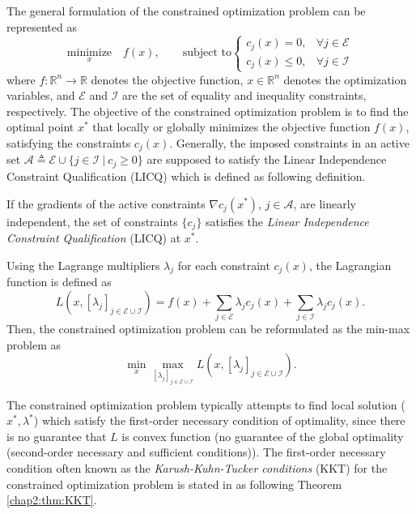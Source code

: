 The general formulation of the constrained optimization problem can be represented as 
\begin{equation}
    \underset{x}{\text{minimize}}\quad f(x),
    \quad\quad
    \text{subject to}
    \begin{cases}
      c_j(x)= 0,    & \forall j\in\mathcal E\\
      c_j(x)\leq 0, & \forall j\in\mathcal I 
    \end{cases}
\end{equation}
where $f:\mathbb R^n\to\mathbb R$ denotes the objective function, $x\in\mathbb R^n$ denotes the optimization variables, and $\mathcal E$ and $\mathcal I$ are the set of equality and inequality constraints, respectively.
The objective of the constrained optimization problem is to find the optimal point $x^*$ that locally or globally minimizes the objective function $f(x)$, satisfying the constraints $c_j(x)$.
Generally, the imposed constraints in an active set $\mathcal A\triangleq\mathcal E \cup \{j\in\mathcal I\ \vert \ c_j\ge0\}$ are supposed to satisfy the Linear Independence Constraint Qualification (LICQ) which is defined as following definition.

\begin{definition}
  If the gradients of the active constraints $\nabla c_j(x^*)$, $j\in\mathcal A$, are linearly independent, the set of constraints $\{c_j\}$ satisfies the \textit{Linear Independence Constraint Qualification} (LICQ) at $x^*$.
  \label{chap2:def:LICQ}  
\end{definition}

Using the Lagrange multipliers $\lambda_j$ for each constraint $c_j(x)$, the Lagrangian function is defined as
\begin{equation}
    L(x,[\lambda_j]_{j\in\mathcal E\cup\mathcal I}) = f(x) + \sum_{j\in\mathcal E}\lambda_jc_j(x) + \sum_{j\in\mathcal I}\lambda_jc_j(x)
    .
\end{equation}
Then, the constrained optimization problem can be reformulated as the min-max problem as
\begin{equation}
  \min_x \max_{[\lambda_j]_{j\in\mathcal E\cup\mathcal I}} L(x, [\lambda_j]_{j\in\mathcal E\cup\mathcal I})
  .
\end{equation}

The constrained optimization problem typically attempts to find local solution ($x^*,\lambda^*$) which satisfy the first-order necessary condition of optimality, since there is no guarantee that $L$ is convex function (\ie no guarantee of the global optimality (second-order necessary and sufficient conditions)).
The first-order necessary condition often known as the \textit{Karush-Kuhn-Tucker conditions} (KKT) for the constrained optimization problem is stated in \cite{RN9} as following Theorem \ref{chap2:thm:KKT}.

